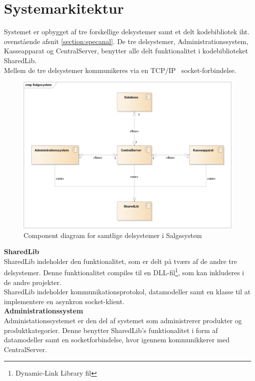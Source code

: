 \section{Systemarkitektur}
Systemet er opbygget af tre forskellige delsystemer samt et delt kodebibliotek iht. ovenstående afsnit \ref{section:specanal}. De tre delsystemer, Administrationssystem, Kasseapparat og CentralServer, benytter alle delt funktionalitet i kodebiblioteket SharedLib.\\

Mellem de tre delsystemer kommunikeres via en TCP/IP~\cite{TCPIP} socket-forbindelse.

\begin{figure}[H]
    \centering
    \includegraphics[width=1\textwidth]{Projektbeskrivelse/Systemarkitektur/Components.png}
    \caption{Component diagram for samtlige delsystemer i Salgssystem}
    \label{fig:CSLogging}
\end{figure}


\textbf{SharedLib}\\
SharedLib indeholder den funktionalitet, som er delt på tværs af de andre tre delsystemer. Denne funktionalitet compiles til en DLL-fil\footnote{Dynamic-Link Library fil}, som kan inkluderes i de andre projekter.\\

SharedLib indeholder kommunikationsprotokol, datamodeller samt en klasse til at implementere en asynkron socket-klient.\\

\textbf{Administrationssystem}\\
Administationssystemet er den del af systemet som administrerer produkter og produktkategorier. Denne benytter SharedLib's funktionalitet i form af datamodeller samt en socketforbindelse, hvor igennem kommunikkerer med CentralServer.\\


